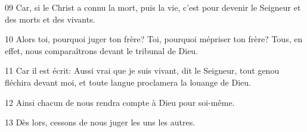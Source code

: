 
09 Car, si le Christ a connu la mort, puis la vie, c’est pour devenir le Seigneur et des morts et des vivants.

10 Alors toi, pourquoi juger ton frère? Toi, pourquoi mépriser ton frère? Tous, en effet, nous comparaîtrons devant le tribunal de Dieu.

11 Car il est écrit: Aussi vrai que je suis vivant, dit le Seigneur, tout genou fléchira devant moi, et toute langue proclamera la louange de Dieu.

12 Ainsi chacun de nous rendra compte à Dieu pour soi-même.

13 Dès lors, cessons de nous juger les uns les autres.